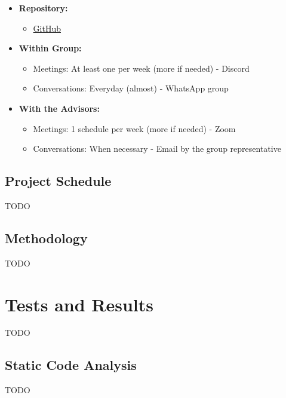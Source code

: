\documentclass[a4paper,11pt]{article}
\begin{document}
        \begin{itemize}
            \item \textbf{Repository:} 
            \begin{itemize}
                \item \href{https://github.com/Mycsina/DiSA/tree/main}{GitHub}
            \end{itemize}
            \item \textbf{Within Group:}
            \begin{itemize}
                \item Meetings: At least one per week (more if needed) - Discord
                \item Conversations: Everyday (almost) - WhatsApp group
            \end{itemize}
            \item \textbf{With the Advisors:}
            \begin{itemize}
                \item Meetings: 1 schedule per week (more if needed) - Zoom
                \item Conversations: When necessary - Email by the group representative
            \end{itemize}
        \end{itemize}
        
        
    \vspace{0.5cm}
    \subsection{Project Schedule}
        TODO
        
    \vspace{0.5cm}
    \subsection{Methodology}
        TODO

    \clearpage %
    \section{Tests and Results}\label{sec:testsresults}
        TODO
        
    \vspace{0.5cm}
    \subsection{Static Code Analysis}
        TODO
\end{document}
